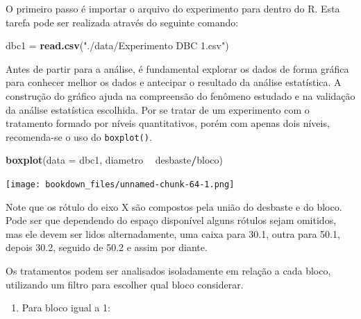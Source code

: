 \documentclass[
]{article}
\newenvironment{Shaded}{\begin{snugshade}}{\end{snugshade}}
\newcommand{\DataTypeTok}[1]{\textcolor[rgb]{0.13,0.29,0.53}{#1}}
\newcommand{\DecValTok}[1]{\textcolor[rgb]{0.00,0.00,0.81}{#1}}
\newcommand{\KeywordTok}[1]{\textcolor[rgb]{0.13,0.29,0.53}{\textbf{#1}}}
\newcommand{\NormalTok}[1]{#1}
\newcommand{\OperatorTok}[1]{\textcolor[rgb]{0.81,0.36,0.00}{\textbf{#1}}}
\newcommand{\StringTok}[1]{\textcolor[rgb]{0.31,0.60,0.02}{#1}}
\providecommand{\tightlist}{%
  \setlength{\itemsep}{0pt}\setlength{\parskip}{0pt}}
\begin{document}
O primeiro passo é importar o arquivo do experimento para dentro do R. Esta tarefa pode ser realizada através do seguinte comando:

\begin{Shaded}
\begin{Highlighting}[]
\NormalTok{dbc1 =}\StringTok{ }\KeywordTok{read.csv}\NormalTok{(}\StringTok{"./data/Experimento DBC 1.csv"}\NormalTok{)}
\end{Highlighting}
\end{Shaded}

Antes de partir para a análise, é fundamental explorar os dados de forma gráfica para conhecer melhor os dados e antecipar o resultado da análise estatística. A construção do gráfico ajuda na compreensão do fenômeno estudado e na validação da análise estatística escolhida. Por se tratar de um experimento com o tratamento formado por níveis quantitativos, porém com apenas dois níveis, recomenda-se o uso do \texttt{boxplot()}.

\begin{Shaded}
\begin{Highlighting}[]
\KeywordTok{boxplot}\NormalTok{(}\DataTypeTok{data =}\NormalTok{ dbc1, diametro }\OperatorTok{~}\StringTok{ }\NormalTok{desbaste}\OperatorTok{/}\NormalTok{bloco)}
\end{Highlighting}
\end{Shaded}

\texttt{[image: bookdown\_files/unnamed-chunk-64-1.png]}

Note que os rótulo do eixo X são compostos pela união do desbaste e do bloco. Pode ser que dependendo do espaço disponível alguns rótulos sejam omitidos, mas ele devem ser lidos alternadamente, uma caixa para 30.1, outra para 50.1, depois 30.2, seguido de 50.2 e assim por diante.

Os tratamentos podem ser analisados isoladamente em relação a cada bloco, utilizando um filtro para escolher qual bloco considerar.

\begin{enumerate}
\def\labelenumi{\arabic{enumi}.}
\tightlist
\item
  Para bloco igual a 1:
\end{enumerate}

\begin{Shaded}
\end{Shaded}
\end{document}
